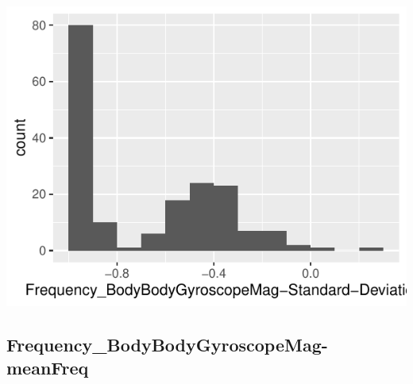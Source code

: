 \documentclass[
]{article}
\begin{document}
\begin{minipage}{0.25 \textwidth}

\includegraphics{codebook_tidydatasub_files/figure-latex/Var-77-Frequency-BodyBodyGyroscopeMag-Standard-Deviation--1.pdf}

\end{minipage}

\noindent\makebox[\linewidth]{\rule{\textwidth}{0.4pt}}

\hypertarget{frequency_bodybodygyroscopemag-meanfreq}{%
\subsection{Frequency\_BodyBodyGyroscopeMag-meanFreq}\label{frequency_bodybodygyroscopemag-meanfreq}}
\end{document}
